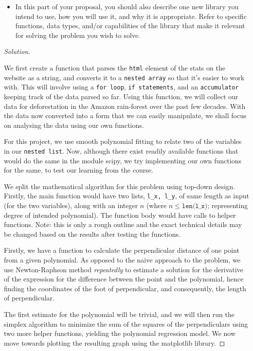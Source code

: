 \documentclass[12pt]{article}
\newenvironment{solution}
  {\renewcommand\qedsymbol{$\blacksquare$}
  \begin{proof}[Solution]}
  {\end{proof}}
\renewcommand\qedsymbol{$\blacksquare$}
\begin{document}
\begin{enumerate}
\begin{itemize}
    \item In this part of your proposal, you should also describe one new library you intend to use, how you will use it, and why it is appropriate. Refer to specific functions, data types, and/or capabilities of the library that make it relevant for solving the problem you wish to solve.
\end{itemize}

\begin{solution}\

We first create a function that parses the \texttt{html} element of the stats on the website as a string, and converts it to a \texttt{nested array} so that it’s easier to work with. This will involve using a \texttt{for loop}, \texttt{if statements}, and an \texttt{accumulator} keeping track of the data parsed so far. Using this function, we will collect our data for deforestation in the Amazon rain-forest over the past few decades. With the data now converted into a form that we can easily manipulate, we shall focus on analysing the data using our own functions.

For this project, we use smooth polynomial fitting to relate two of the variables in our \texttt{nested list}. Now, although there exist readily available functions that would do the same in the module scipy, we try implementing our own functions for the same, to test our learning from the course.

We split the mathematical algorithm for this problem using top-down design. Firstly, the main function would have two lists, \texttt{l\_x, l\_y}, of same length as input (for the two variables), along with an integer $n$ (where $n \leq \texttt{len(l\_x)}$; representing degree of intended polynomial). The function body would have calls to helper functions. Note: this is only a rough outline and the exact technical details may be changed based on the results after testing the functions.

Firstly, we have a function to calculate the perpendicular distance of one point from a given polynomial. As opposed to the naive approach to the problem, we use Newton-Raphson method \textit{repeatedly} to estimate a solution for the derivative of the expression for the difference between the point and the polynomial, hence finding the coordinates of the foot of perpendicular, and consequently, the length of perpendicular.

The first estimate for the polynomial will be trivial, and we will then run the simplex algorithm to minimize the sum of the squares of the perpendiculars using two more helper functions, yielding the polynomial regression model. We now move towards plotting the resulting graph using the matplotlib library.


\end{solution}
\end{enumerate}
\end{document}
